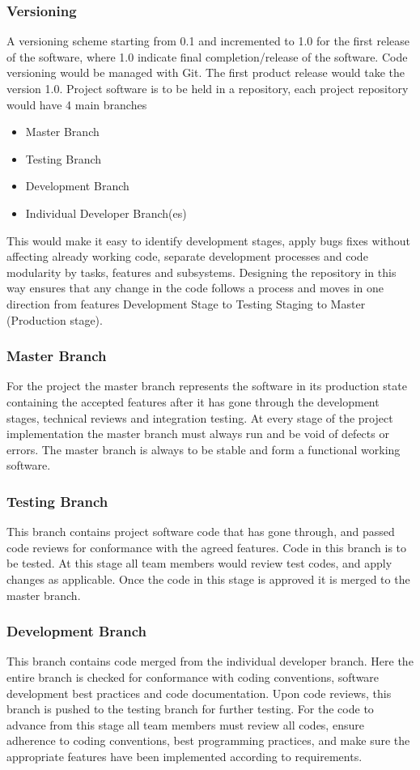\documentclass{article}
\begin{document}
\subsubsection{Versioning}
A versioning scheme starting from 0.1 and incremented to 1.0 for the first release of the software, where 1.0 indicate final completion/release of the software. Code versioning would be managed with Git. The first product release would take the version 1.0. Project software is to be held in a repository, each project repository would have 4 main branches
\begin{itemize}
\item
Master Branch
\item
Testing Branch
\item
Development Branch
\item
Individual Developer Branch(es)
\end{itemize}
This would make it easy to identify development stages, apply bugs fixes without affecting already working code, separate development processes and code modularity by tasks, features and subsystems. Designing the repository in this way ensures that any change in the code follows a process and moves in one direction from features Development Stage to Testing Staging to Master (Production stage).
\subsubsection{Master Branch}
For the project the master branch represents the software in its production state containing the accepted features after it has gone through the development stages, technical reviews and integration testing. At every stage of the project implementation the master branch must always run and be void of defects or errors. The master branch is always to be stable and form a functional working software.
\subsubsection{Testing Branch}
This branch contains project software code that has gone through, and passed code reviews for conformance with the agreed features. Code in this branch is to be tested. At this stage all team members would review test codes, and apply changes as applicable. Once the code in this stage is approved it is merged to the master branch.
\subsubsection{Development Branch}
This branch contains code merged from the individual developer branch. Here the entire branch is checked for conformance with coding conventions, software development best practices and code documentation. Upon code reviews, this branch is pushed to the testing branch for further testing. For the code to advance from this stage all team members must review all codes, ensure adherence to coding conventions, best programming practices, and make sure the appropriate features have been implemented according to requirements.
\end{document}
